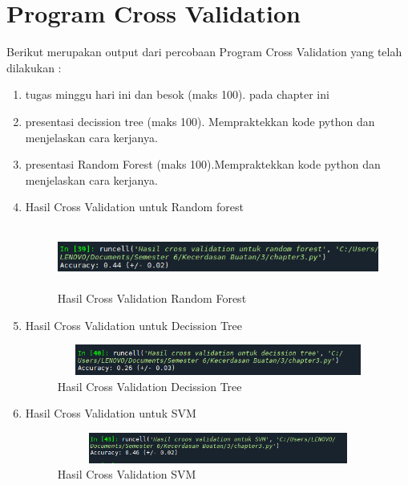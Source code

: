 \section{Program Cross Validation}
Berikut merupakan output dari percobaan Program Cross Validation yang telah dilakukan :
\begin{enumerate}
    \item tugas minggu hari ini dan besok (maks 100). pada chapter ini
    \item presentasi decission tree (maks 100). Mempraktekkan kode python dan menjelaskan cara kerjanya.
    \item presentasi Random Forest (maks 100).Mempraktekkan kode python dan menjelaskan cara kerjanya.
    \item Hasil Cross Validation untuk Random forest
          \begin{figure}[!htbp]
              \centering
              \includegraphics[width=14cm,height=2cm]{figures/Cp3-17.png}
              \caption{Hasil Cross Validation Random Forest}
              \label{penanda}
          \end{figure}
    \item Hasil Cross Validation untuk Decission Tree
          \begin{figure}[!htbp]
              \centering
              \includegraphics[width=14cm,height=1cm]{figures/Cp3-18.png}
              \caption{Hasil Cross Validation Decission Tree}
              \label{penanda}
          \end{figure}
    \item Hasil Cross Validation untuk SVM
          \begin{figure}
              \centering
              \includegraphics[width=14cm,height=1cm]{figures/Cp3-19.png}
              \caption{Hasil Cross Validation SVM}
              \label{penanda}
          \end{figure}
\end{enumerate}

